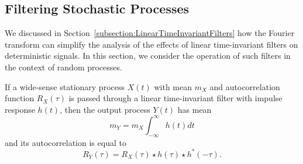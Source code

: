 \subsection{Filtering Stochastic Processes}

We discussed in Section~\ref{subsection:LinearTimeInvariantFilters} how the Fourier transform can simplify the analysis of the effects of linear time-invariant filters on deterministic signals.
In this section, we consider the operation of such filters in the context of random processes.

\begin{theorem}
If a wide-sense stationary process $X(t)$ with mean $m_X$ and autocorrelation function $R_X(\tau)$ is passed through a linear time-invariant filter with impulse response $h(t)$, then the output process $Y(t)$ has mean
\begin{equation*}
m_Y = m_X \int_{-\infty}^{\infty} h(t) dt
\end{equation*}
and its autocorrelation is equal to
\begin{equation*}
R_Y (\tau) = R_X(\tau) \star h(\tau) \star h^*(-\tau) .
\end{equation*}
\end{theorem}
